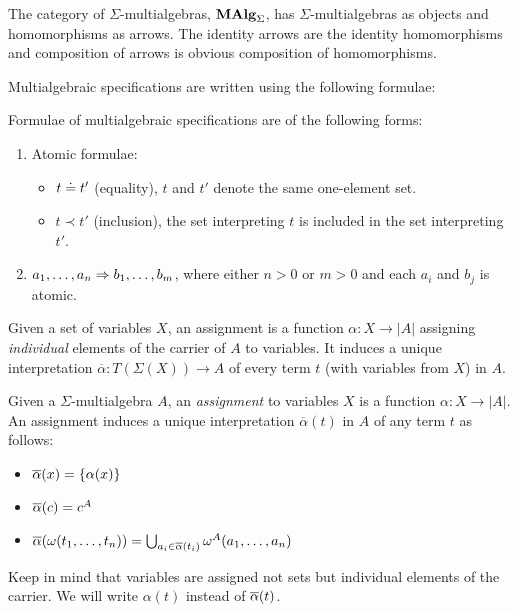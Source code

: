 \documentclass[10pt]{article}
\begin{document}
\begin{definition} 
The category of $\Sigma$-multialgebras, ${\bf MAlg}_{\Sigma}$, has $\Sigma$-multialgebras as
objects and homomorphisms as arrows.  The identity arrows are the identity
homomorphisms and composition of arrows is obvious composition of
homomorphisms.
\end{definition} 
Multialgebraic specifications are written using the following formulae:
%
\begin{definition}
Formulae of multialgebraic specifications are of the following forms:
\begin{enumerate}\MyLPar
\item Atomic formulae:
\begin{itemize}\MyLPar
\item $t \mathrel{\dot{=} }  t'$ (equality), $t$ and $t'$ denote the same one-element set.
\item $t \prec t'$ (inclusion), the set interpreting $t$ is included in
the set interpreting $t'$.
\end{itemize}
\item $a_1, \ldots ,a_n \Rightarrow b_1, \ldots ,b_m$, where either $n>0$ or $m>0$ and
each $a_i$ and $b_j$ is atomic.
\end{enumerate}
\end{definition}
%
Given a set of variables $X$, an assignment is a function $\alpha: X \to |A|$ 
assigning {\em individual} elements of the carrier of $A$ to variables. It induces a unique
interpretation $\overline{\alpha}: T(\Sigma(X)) \to A$ of every term $t$
(with variables from $X$) in
$A$.
\begin{definition} Given a $\Sigma$-multialgebra $A$, an {\it assignment} to 
variables $X$ is a function $\alpha:X \to |A|$. An assignment induces a
unique interpretation $\overline{\alpha}(t)$ in $A$ of any term $t$ as
follows:
\begin{itemize}\MyLPar
\item $\overline{\alpha}(x)=\{\alpha(x)\}$
\item $\overline{\alpha}(c)=c^A$
\item $\overline{\alpha}(\omega(t_1, \ldots ,t_n)) = \bigcup_{a_{i}\in\overline{\alpha}(t_{i})}\omega^A(a_1, \ldots ,a_n)$
\end{itemize}
\end{definition}
Keep in mind that variables are assigned not sets but individual
elements of the carrier. 
We will write $\alpha(t)$ instead of $\overline{\alpha}(t)$.
 
\end{document}

